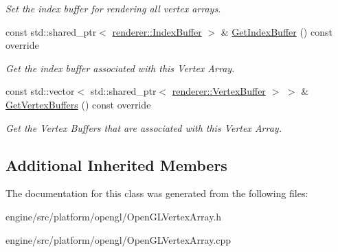\begin{DoxyCompactItemize}
\begin{DoxyCompactList}\small\item\em Set the index buffer for rendering all vertex arrays. \end{DoxyCompactList}\item 
\mbox{\label{classengine_1_1platform_1_1opengl_1_1OpenGLVertexArray_a3f7b89ecb158aa2b8b9f0e4616dccb5d}} 
const std\+::shared\+\_\+ptr$<$ \hyperlink{classengine_1_1renderer_1_1IndexBuffer}{renderer\+::\+Index\+Buffer} $>$ \& \hyperlink{classengine_1_1platform_1_1opengl_1_1OpenGLVertexArray_a3f7b89ecb158aa2b8b9f0e4616dccb5d}{Get\+Index\+Buffer} () const override
\begin{DoxyCompactList}\small\item\em Get the index buffer associated with this Vertex Array. \end{DoxyCompactList}\item 
\mbox{\label{classengine_1_1platform_1_1opengl_1_1OpenGLVertexArray_a0bebcee0be99df9ab3ae3372d1a8dc37}} 
const std\+::vector$<$ std\+::shared\+\_\+ptr$<$ \hyperlink{classengine_1_1renderer_1_1VertexBuffer}{renderer\+::\+Vertex\+Buffer} $>$ $>$ \& \hyperlink{classengine_1_1platform_1_1opengl_1_1OpenGLVertexArray_a0bebcee0be99df9ab3ae3372d1a8dc37}{Get\+Vertex\+Buffers} () const override
\begin{DoxyCompactList}\small\item\em Get the Vertex Buffers that are associated with this Vertex Array. \end{DoxyCompactList}\end{DoxyCompactItemize}
\subsection*{Additional Inherited Members}


The documentation for this class was generated from the following files\+:\begin{DoxyCompactItemize}
\item 
engine/src/platform/opengl/Open\+G\+L\+Vertex\+Array.\+h\item 
engine/src/platform/opengl/Open\+G\+L\+Vertex\+Array.\+cpp\end{DoxyCompactItemize}
